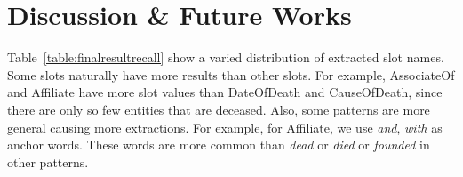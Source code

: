 

\section{Discussion \& Future Works}


Table~\ref{table:finalresultrecall} show a varied distribution of 
extracted slot names.
Some slots naturally have more results than other slots. For example,
AssociateOf and Affiliate have more slot values than DateOfDeath and
CauseOfDeath, since there are only so few entities that are deceased.
Also, some patterns are more general causing more extractions.
For example, for Affiliate, we use \textit{and},
\textit{with} as anchor words. These words are more common than \textit{dead} or \textit{died} or \textit{founded} in other patterns. 

